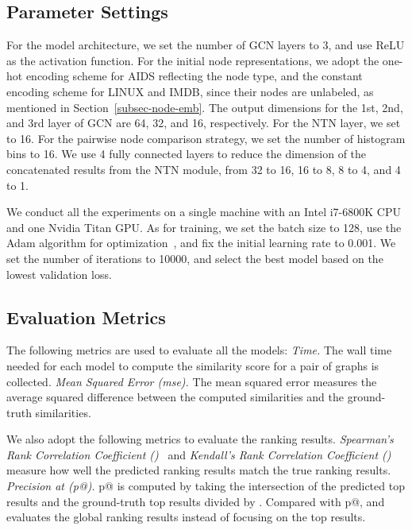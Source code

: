 \documentclass[sigconf]{acmart}
\begin{document}
\subsection{Parameter Settings} 
\label{subsec-param-set}

For the model architecture, we set the number of GCN layers to 3, and use ReLU as the activation function. For the initial node representations, we adopt the one-hot encoding scheme for AIDS reflecting the node type, and the constant encoding scheme for LINUX and IMDB, since their nodes are unlabeled, as mentioned in Section~\ref{subsec-node-emb}. The output dimensions for the 1st, 2nd, and 3rd layer of GCN are 64, 32, and 16, respectively. For the NTN layer, we set  to 16. For the pairwise node comparison strategy, we set the number of histogram bins to 16. We use 4 fully connected layers to reduce the dimension of the concatenated results from the NTN module, from 32 to 16, 16 to 8, 8 to 4, and 4 to 1.

We conduct all the experiments on a single machine with an Intel i7-6800K CPU and one Nvidia Titan GPU. As for training, we set the batch size to 128, use the Adam algorithm for optimization~\cite{kingma2014adam}, and fix the initial learning rate to 0.001. We set the number of iterations to 10000, and select the best model based on the lowest validation loss. 

\subsection{Evaluation Metrics}

The following metrics are used to evaluate all the models: \textit{Time.} The wall time needed for each model to compute the similarity score for a pair of graphs is collected. \textit{Mean Squared Error (mse).} The mean squared error measures the average squared difference between the computed similarities and the ground-truth similarities. 

We also adopt the following metrics to evaluate the ranking results. \textit{Spearman's Rank Correlation Coefficient ()}~\cite{spearman1904proof} and \textit{Kendall's Rank Correlation Coefficient ()}~\cite{kendall1938new} measure how well the predicted ranking results match the true ranking results. \textit{Precision at  (p@).} p@ is computed by taking the intersection of the predicted top  results and the ground-truth top  results divided by . Compared with p@,  and  evaluates the global ranking results instead of focusing on the top  results.
\end{document}
